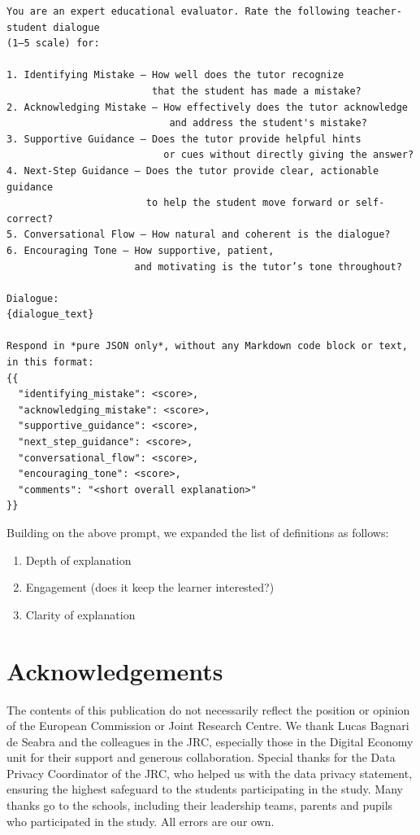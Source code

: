 \documentclass[
  11pt,
]{article}
\providecommand{\tightlist}{%
  \setlength{\itemsep}{0pt}\setlength{\parskip}{0pt}}
\begin{document}
\begin{verbatim}
You are an expert educational evaluator. Rate the following teacher-student dialogue 
(1–5 scale) for:

1. Identifying Mistake — How well does the tutor recognize 
                         that the student has made a mistake?
2. Acknowledging Mistake — How effectively does the tutor acknowledge 
                            and address the student's mistake?
3. Supportive Guidance — Does the tutor provide helpful hints
                           or cues without directly giving the answer?
4. Next-Step Guidance — Does the tutor provide clear, actionable guidance 
                        to help the student move forward or self-correct?
5. Conversational Flow — How natural and coherent is the dialogue?
6. Encouraging Tone — How supportive, patient, 
                      and motivating is the tutor’s tone throughout?

Dialogue:
{dialogue_text}

Respond in *pure JSON only*, without any Markdown code block or text, in this format:
{{
  "identifying_mistake": <score>,
  "acknowledging_mistake": <score>,
  "supportive_guidance": <score>,
  "next_step_guidance": <score>,
  "conversational_flow": <score>,
  "encouraging_tone": <score>,
  "comments": "<short overall explanation>"
}}
\end{verbatim}

Building on the above prompt, we expanded the list of definitions as follows:

\begin{enumerate}
\def\labelenumi{\arabic{enumi}.}
\tightlist
\item
  Depth of explanation
\item
  Engagement (does it keep the learner interested?)
\item
  Clarity of explanation
\end{enumerate}

\section{Acknowledgements}\label{acknowledgements}

The contents of this publication do not necessarily reflect the position or opinion of the European Commission or Joint Research Centre. We thank Lucas Bagnari de Seabra and the colleagues in the JRC, especially those in the Digital Economy unit for their support and generous collaboration. Special thanks for the Data Privacy Coordinator of the JRC, who helped us with the data privacy statement, ensuring the highest safeguard to the students participating in the study. Many thanks go to the schools, including their leadership teams, parents and pupils who participated in the study. All errors are our own.
\end{document}
